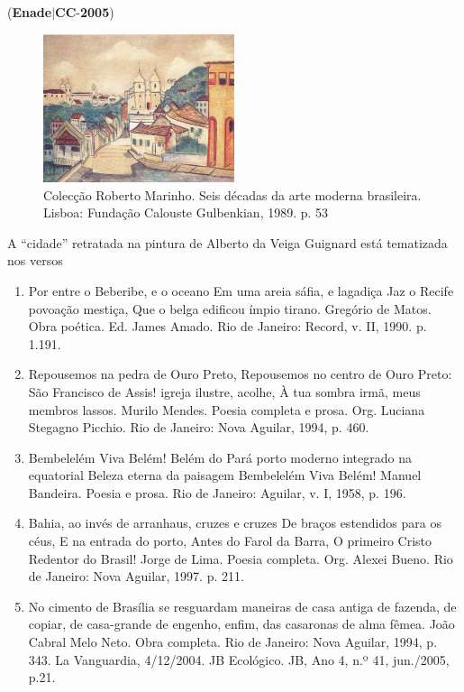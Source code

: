 \documentclass{exam}
\begin{document}
\begin{questions}
\question (\textbf{Enade}$|$\textbf{CC}-\textbf{2005}) \begin{figure}[H]
	\begin{center}
		\includegraphics[width=0.5\textwidth]{CIENCIA_DA_COMPUTACAO_Prova2005-utf8_figuras/fig-0004.jpg}
		\caption{Colecção Roberto Marinho. Seis décadas da arte moderna brasileira. Lisboa: Fundação Calouste Gulbenkian, 1989. p. 53}
	\end{center}
\end{figure}
A “cidade” retratada na pintura de Alberto da Veiga Guignard está
tematizada nos versos
	\begin{enumerate}[label=\alph*)]
		\item  Por entre o Beberibe, e o oceano
Em uma areia sáfia, e lagadiça
Jaz o Recife povoação mestiça,
Que o belga edificou ímpio tirano.
Gregório de Matos. Obra poética. Ed. James
Amado. Rio de Janeiro: Record, v. II, 1990. p. 1.191.
		\item  Repousemos na pedra de Ouro Preto,
Repousemos no centro de Ouro Preto:
São Francisco de Assis! igreja ilustre, acolhe,
À tua sombra irmã, meus membros lassos.
Murilo Mendes. Poesia completa e prosa. Org. Luciana
Stegagno Picchio. Rio de Janeiro: Nova Aguilar, 1994, p. 460.
		\item  Bembelelém
Viva Belém!
Belém do Pará porto moderno integrado na equatorial
Beleza eterna da paisagem
Bembelelém
Viva Belém!
Manuel Bandeira. Poesia e prosa. Rio
de Janeiro: Aguilar, v. I, 1958, p. 196.
		\item  Bahia, ao invés de arranhaus, cruzes e cruzes
De braços estendidos para os céus,
E na entrada do porto,
Antes do Farol da Barra,
O primeiro Cristo Redentor do Brasil!
Jorge de Lima. Poesia completa. Org. Alexei
Bueno. Rio de Janeiro: Nova Aguilar, 1997. p. 211.
		\item  No cimento de Brasília se resguardam
maneiras de casa antiga de fazenda,
de copiar, de casa-grande de engenho,
enfim, das casaronas de alma fêmea.
João Cabral Melo Neto. Obra completa. Rio
de Janeiro: Nova Aguilar, 1994, p. 343.
La Vanguardia, 4/12/2004.
JB Ecológico. JB, Ano 4, n.º 41, jun./2005, p.21.


\end{enumerate}
\end{questions}
\end{document}
